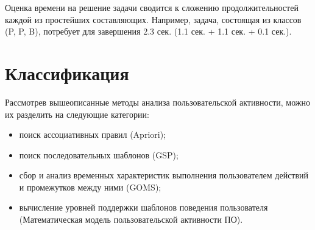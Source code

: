 Оценка времени на решение задачи сводится к сложению продолжительностей каждой из простейших составляющих. Например, задача, состоящая из классов (P, P, B), потребует для завершения 2.3 сек. (1.1 сек. + 1.1 сек. + 0.1 сек.).

\section{Классификация}
Рассмотрев вышеописанные методы анализа пользовательской активности, можно их разделить на следующие категории:
\begin{itemize}
	\item поиск ассоциативных правил (Apriori);
	\item поиск последовательных шаблонов (GSP);
	\item сбор и анализ временных характеристик выполнения пользователем действий и промежутков между ними (GOMS);
	\item вычисление уровней поддержки шаблонов поведения пользователя (Математическая модель пользовательской активности ПО).
\end{itemize}

